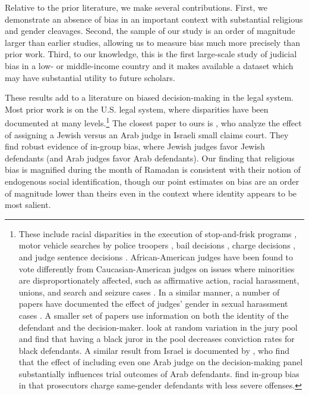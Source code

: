 \documentclass[12pt,english]{article}
\begin{document}
Relative to the prior literature, we make several contributions. First, we demonstrate an absence of bias in an important context with substantial religious and gender cleavages. Second, the sample of our study is an order of magnitude larger than earlier studies, allowing us to measure bias much more precisely than prior work. Third, to our knowledge, this is the first large-scale study of judicial bias in a low- or middle-income country and it makes available a dataset which may have substantial utility to future scholars.

These results add to a literature on biased decision-making in the legal system. Most  prior work is on the U.S. legal system, where disparities have been documented at many levels.\footnote{These include racial disparities in the execution of stop-and-frisk programs \citep{GoelRaoShroffothers2016TAoAS}, motor vehicle searches by police troopers \citep{anwar2006alternative}, bail decisions \citep{arnold2018racial}, charge decisions \citep{RehaviStarr2014JoPE}, and judge sentence decisions \citep{Mustard2001TJoLaE,AbramsBertrandMullainathan2012TJoLS, AlesinaLaFerrara2014TAER, kastellec2013racial}. African-American judges have been found to vote differently from Caucasian-American judges on issues where minorities are disproportionately affected, such as affirmative action, racial harassment, unions, and search and seizure cases \citep{Scherer2004PSQ,ChewKelley2008WUR,Kastellec2011PRQ}. In a similar manner, a number of papers have documented the effect of judges' gender in sexual harassment cases \citep{BoydEpsteinMartin2010AJoPS,Peresie2005TYLJ}. A smaller set of papers use information on both the identity of the defendant and the decision-maker. \citet{AnwarBayerHjalmarsson2012TQJoE} look at random variation in the jury pool and find that having a black juror in the pool decreases conviction rates for black defendants. A similar result from Israel is documented by \citet{grossman2016descriptive}, who find that the effect of including even one Arab judge on the decision-making panel substantially influences trial outcomes of Arab defendants. \cite{Didwania2018CLE} find in-group bias in that prosecutors charge same-gender defendants with less severe offenses.} The closest paper to ours is \citet{ShayoZussman2011QJE}, who analyze the effect of assigning a Jewish versus an Arab judge in Israeli small claims court. They find robust evidence of in-group bias, where Jewish judges favor Jewish defendants (and Arab judges favor Arab defendants). Our finding that religious bias is magnified during the month of Ramadan is consistent with their notion of endogenous social identification, though our point estimates on bias are an order of magnitude lower than theirs even in the context where identity appears to be most salient.
\end{document}
